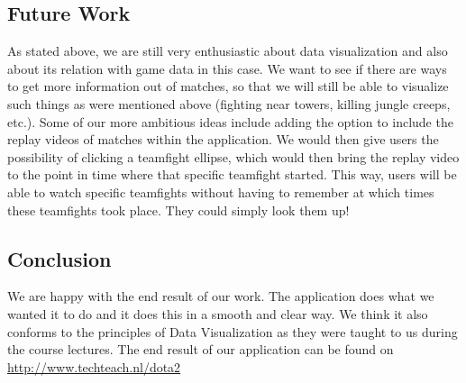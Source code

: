 \documentclass[11pt,twoside,a4paper]{article}
\begin{document}
\subsection{Future Work}
As stated above, we are still very enthusiastic about data visualization and also about its relation with game data in this case. We want to see if there are ways to get more information out of matches, so that we will still be able to visualize such things as were mentioned above (fighting near towers, killing jungle creeps, etc.).\newline
Some of our more ambitious ideas include adding the option to include the replay videos of matches within the application. We would then give users the possibility of clicking a teamfight ellipse, which would then bring the replay video to the point in time where that specific teamfight started. This way, users will be able to watch specific teamfights without having to remember at which times these teamfights took place. They could simply look them up!

\subsection{Conclusion}
We are happy with the end result of our work. The application does what we wanted it to do and it does this in a smooth and clear way. We think it also conforms to the principles of Data Visualization as they were taught to us during the course lectures.
The end result of our application can be found on \url{http://www.techteach.nl/dota2}
\end{document}
